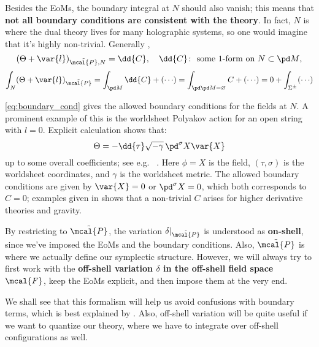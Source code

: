 \documentclass[a4paper
	,10pt
]{article}
\begin{document}
	Besides the EoMs, the boundary integral at $N$ should also vanish; this means that \textbf{not all boundary conditions are consistent with the theory}. 
	In fact, $N$ is where the dual theory lives for many holographic systems, so one would imagine that it's highly non-trivial. Generally \cite{Harlow:2019yfa},
	\begin{equation}
		(\Theta + \var{l})_{\tilde{\mcal{P}},N}
		= \dd{C},
	\quad
		\dd{C}\colon\ %
		\text{some 1-form on $N \subset \pd M$},
	\label{eq:boundary_cond}
	\end{equation}
	\vspace{-.8\baselineskip}
	\begin{equation}
		\int_{N} (\Theta + \var{l})_{\tilde{\mcal{P}}}
		= \int_{\pd M} \dd{C}
			+ ({\cdots})
		= \int_{\pd \pd M = \varnothing} C
			+ ({\cdots})
		= 0
			+ \int_{\Sigma^\pm} ({\cdots})
	\end{equation}
	
	\eqref{eq:boundary_cond} gives the allowed boundary conditions for the fields at $N$. A prominent example of this is the worldsheet Polyakov action for an open string with $l = 0$. Explicit calculation shows that:
	\begin{equation}
		\Theta = - \dd{\tau} \sqrt{-\gamma}\,
			\pd^\sigma X \var{X}
	\end{equation}
	up to some overall coefficients; see e.g.~\textsl{\citeauthor{Polchinski:1998rq}} \cite{Polchinski:1998rq}. Here $\phi = X$ is the field, $(\tau,\sigma)$ is the worldsheet coordinates, and $\gamma$ is the worldsheet metric. The allowed boundary conditions are given by $\var{X} = 0$ or $\pd^\sigma X = 0$, which both corresponds to $C = 0$; examples given in \cite{Harlow:2019yfa} shows that a non-trivial $C$ arises for higher derivative theories and gravity. 
	
	By restricting to $\tilde{\mcal{P}}$, the variation $\delta|_{\tilde{\mcal{P}}}$ is understood as \textbf{on-shell}, since we've imposed the EoMs and the boundary conditions. Also, $\tilde{\mcal{P}}$ is where we actually define our symplectic structure. However, we will always try to first work with the \textbf{off-shell variation $\delta$ in the off-shell field space $\mcal{F}$}, keep the EoMs explicit, and then impose them at the very end. 
	
	We shall see that this formalism will help us avoid confusions with boundary terms, which is best explained by \textcite{Banados:2016zim}. Also, off-shell variation will be quite useful if we want to quantize our theory, where we have to integrate over off-shell configurations as well. 
	
\end{document}
